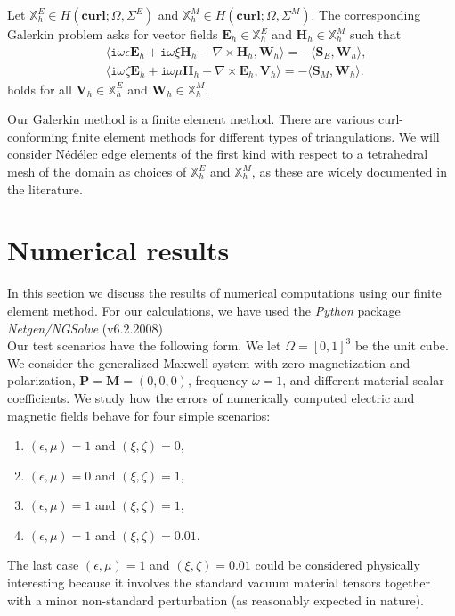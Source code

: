 \documentclass[journal,transmag]{IEEEtran}
\newcommand*\VF[1]{\mathbf{#1}}
\newcommand*\iunit{\mathtt{i}}
\newcommand{\bbX}{\mathbb{X}}
\newcommand{\curl}{\VF{curl}}
\begin{document}
Let $\bbX_{h}^{E} \in H(\curl;\Omega,\Sigma^{E})$ and $\bbX_{h}^{M} \in H(\curl;\Omega,\Sigma^{M})$.
The corresponding Galerkin problem asks for vector fields 
$\VF{E}_{h} \in \bbX_{h}^{E}$ and $\VF{H}_{h} \in \bbX_{h}^{M}$
such that 
\begin{align*} 
 &
 \langle \iunit \omega \epsilon \VF{E}_{h} + \iunit \omega \xi \VF{H}_{h} - \nabla\times\VF{H}_{h}, \VF{W}_{h} \rangle 
 =
 -\langle \VF{S}_{E}, \VF{W}_{h} \rangle
 ,
 \\
 &
 \langle \iunit \omega \zeta \VF{E}_{h} + \iunit \omega \mu \VF{H}_{h} + \nabla\times\VF{E}_{h}, \VF{V}_{h} \rangle
 =
 -\langle \VF{S}_{M}, \VF{W}_{h} \rangle
 .
\end{align*} 
holds for all $\VF{V}_{h} \in \bbX_{h}^{E}$ and $\VF{W}_{h} \in \bbX_{h}^{M}$.

Our Galerkin method is a finite element method. 
There are various curl-conforming finite element methods for different types of triangulations. 
We will consider N\'ed\'elec edge elements of the first kind with respect to a tetrahedral mesh of the domain\cite{angermann2019semi,monk1992analysis,monk2019finite,chen2000finite,zaglmayr2006high}
as choices of $\bbX_{h}^{E}$ and $\bbX_{h}^{M}$, as these are widely documented in the literature.



\section{\label{sec:numerics} Numerical results}
In this section we discuss the results of numerical computations 
using our finite element method. 
For our calculations, we have used the \emph{Python} package \emph{Netgen/NGSolve} (v6.2.2008) \cite{schoberl2014c++,zaglmayr2006high} 
\\



Our test scenarios have the following form. 
We let $\Omega = [0,1]^{3}$ be the unit cube. 
We consider the generalized Maxwell system with zero magnetization and polarization,
$\VF{P} = \VF{M} = (0,0,0)$, 
frequency $\omega = 1$, 
and different material scalar coefficients. 
We study how the errors of numerically computed electric and magnetic fields behave for four simple scenarios:
\begin{enumerate}
 \item $(\epsilon,\mu) = 1$ and $(\xi,\zeta) = 0$,
 \item $(\epsilon,\mu) = 0$ and $(\xi,\zeta) = 1$, 
 \item $(\epsilon,\mu) = 1$ and $(\xi,\zeta) = 1$,
 \item $(\epsilon,\mu) = 1$ and $(\xi,\zeta) = 0.01$.
\end{enumerate}
The last case $(\epsilon,\mu) = 1$ and $(\xi,\zeta) = 0.01$ could be considered physically interesting because
it involves the standard vacuum material tensors together with a minor non-standard perturbation (as reasonably expected in nature).
\end{document}
